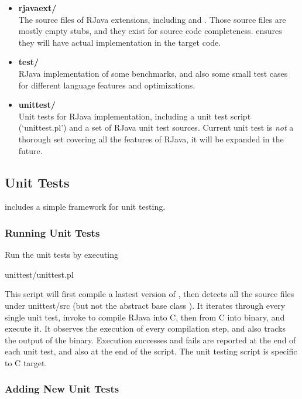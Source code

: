 \documentclass[12pt]{article}
\begin{document}
\begin{itemize}
\item
\textbf{rjava\textunderscore ext/\\}
The source files of RJava extensions, including
 and . 
Those source files are mostly empty stubs, and they exist
for source code completeness. 
\rjc ensures they will have actual implementation in 
the target code.

\item
\textbf{test/\\}
RJava implementation of some benchmarks, and also some
small test cases for different language features and 
optimizations. 

\item
\textbf{unittest/\\}
Unit tests for RJava implementation, including a unit test script (`unittest.pl') 
and a set of RJava unit test sources. Current unit test is
\emph{not} a thorough set covering all the features of RJava, it will 
be expanded in the future. 

\end{itemize}

\subsection{Unit Tests}

\rjcfull includes a simple framework for unit testing. 

\subsubsection{Running Unit Tests}
Run the unit tests by executing 
\begin{cmd}
unittest/unittest.pl
\end{cmd}
This script will first compile a lastest version of \rjcfull, then
detects all the source files under unittest/src (but not the abstract
base class ). It iterates through
every single unit test, invoke \rjc to compile RJava into C, then
from C into binary, and execute it. It observes the execution of every
compilation step, and also tracks the output of the binary. Execution
successes and fails are reported at the end of each unit test, and also
at the end of the script. The unit testing script is specific to C target. 

\subsubsection{Adding New Unit Tests}
\end{document}
